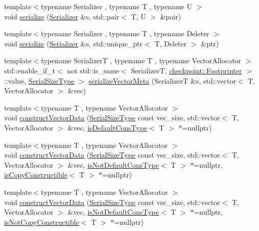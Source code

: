 \begin{DoxyCompactItemize}
\item 
{\footnotesize template$<$typename Serializer , typename T , typename U $>$ }\\void \hyperlink{namespacecheckpoint_a7b5c3ff67d3f7b65cfb46da7617e87ad}{serialize} (\hyperlink{structcheckpoint_1_1_serializer}{Serializer} \&s, std\+::pair$<$ T, U $>$ \&pair)
\item 
{\footnotesize template$<$typename Serializer , typename T , typename Deleter $>$ }\\void \hyperlink{namespacecheckpoint_a617341cb0473cbdce921a3a4d049f4fc}{serialize} (\hyperlink{structcheckpoint_1_1_serializer}{Serializer} \&s, std\+::unique\+\_\+ptr$<$ T, Deleter $>$ \&ptr)
\item 
{\footnotesize template$<$typename SerializerT , typename T , typename Vector\+Allocator $>$ }\\std\+::enable\+\_\+if\+\_\+t$<$ not std\+::is\+\_\+same$<$ SerializerT, \hyperlink{structcheckpoint_1_1_footprinter}{checkpoint\+::\+Footprinter} $>$\+::value, \hyperlink{namespacecheckpoint_a083f6674da3f94c2901b18c6d238217c}{Serial\+Size\+Type} $>$ \hyperlink{namespacecheckpoint_a1f197f1929607e9e28b3d33993196729}{serialize\+Vector\+Meta} (SerializerT \&s, std\+::vector$<$ T, Vector\+Allocator $>$ \&vec)
\item 
{\footnotesize template$<$typename T , typename Vector\+Allocator $>$ }\\void \hyperlink{namespacecheckpoint_a74da9a404a365bb8b0e4f387dbccc18c}{construct\+Vector\+Data} (\hyperlink{namespacecheckpoint_a083f6674da3f94c2901b18c6d238217c}{Serial\+Size\+Type} const vec\+\_\+size, std\+::vector$<$ T, Vector\+Allocator $>$ \&vec, \hyperlink{namespacecheckpoint_a58224a3b056d9e2aa73d563871981a7d}{is\+Default\+Cons\+Type}$<$ T $>$ $\ast$=nullptr)
\item 
{\footnotesize template$<$typename T , typename Vector\+Allocator $>$ }\\void \hyperlink{namespacecheckpoint_a07ac5236be7239b0aa42aa419f514062}{construct\+Vector\+Data} (\hyperlink{namespacecheckpoint_a083f6674da3f94c2901b18c6d238217c}{Serial\+Size\+Type} const vec\+\_\+size, std\+::vector$<$ T, Vector\+Allocator $>$ \&vec, \hyperlink{namespacecheckpoint_a4032c86e7c92702198dd675a2696ee2c}{is\+Not\+Default\+Cons\+Type}$<$ T $>$ $\ast$=nullptr, \hyperlink{namespacecheckpoint_a60a9850fa59d4b236b2f888baf135a95}{is\+Copy\+Constructible}$<$ T $>$ $\ast$=nullptr)
\item 
{\footnotesize template$<$typename T , typename Vector\+Allocator $>$ }\\void \hyperlink{namespacecheckpoint_ab21ae06103ddad9d211e21ea8c79b69f}{construct\+Vector\+Data} (\hyperlink{namespacecheckpoint_a083f6674da3f94c2901b18c6d238217c}{Serial\+Size\+Type} const vec\+\_\+size, std\+::vector$<$ T, Vector\+Allocator $>$ \&vec, \hyperlink{namespacecheckpoint_a4032c86e7c92702198dd675a2696ee2c}{is\+Not\+Default\+Cons\+Type}$<$ T $>$ $\ast$=nullptr, \hyperlink{namespacecheckpoint_a141a100f9dcca06fb0b6dbf44a5d6756}{is\+Not\+Copy\+Constructible}$<$ T $>$ $\ast$=nullptr)

\end{DoxyCompactItemize}
